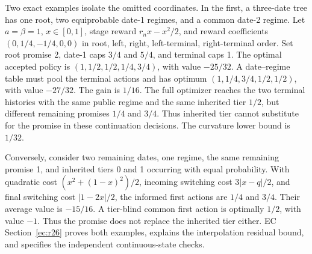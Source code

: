 Two exact examples isolate the omitted coordinates. In the first, a three-date tree has one root, two equiprobable date-1 regimes, and a common date-2 regime. Let $a=\beta=1$, $x\in[0,1]$, stage reward $r_nx-x^2/2$, and reward coefficients $(0,1/4,-1/4,0,0)$ in root, left, right, left-terminal, right-terminal order. Set root promise 2, date-1 caps $3/4$ and $5/4$, and terminal caps 1. The optimal accepted policy is $(1,1/2,1/2,1/4,3/4)$, with value $-25/32$. A date--regime table must pool the terminal actions and has optimum $(1,1/4,3/4,1/2,1/2)$, with value $-27/32$. The gain is $1/16$. The full optimizer reaches the two terminal histories with the same public regime and the same inherited tier $1/2$, but different remaining promises $1/4$ and $3/4$. Thus inherited tier cannot substitute for the promise in these continuation decisions. The curvature lower bound is $1/32$.

Conversely, consider two remaining dates, one regime, the same remaining promise 1, and inherited tiers 0 and 1 occurring with equal probability. With quadratic cost $(x^2+(1-x)^2)/2$, incoming switching cost $3|x-q|/2$, and final switching cost $|1-2x|/2$, the informed first actions are $1/4$ and $3/4$. Their average value is $-15/16$. A tier-blind common first action is optimally $1/2$, with value $-1$. Thus the promise does not replace the inherited tier either. EC Section~\ref{ec:r26} proves both examples, explains the interpolation residual bound, and specifies the independent continuous-state checks.
